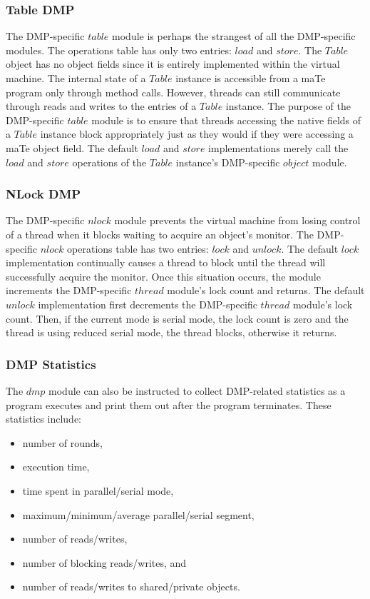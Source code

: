 \subsubsection{Table DMP}

The DMP-specific $table$ module is perhaps the strangest of all the
DMP-specific modules.  The operations table has only two entries:
$load$ and $store$.  The $Table$ object has no object fields since it
is entirely implemented within the virtual machine.  The internal
state of a $Table$ instance is accessible from a maTe program only
through method calls.  However, threads can still communicate through
reads and writes to the entries of a $Table$ instance.  The purpose of
the DMP-specific $table$ module is to ensure that threads accessing
the native fields of a $Table$ instance block appropriately just as
they would if they were accessing a maTe object field.  The default
$load$ and $store$ implementations merely call the $load$ and $store$
operations of the $Table$ instance's DMP-specific $object$ module.

\subsubsection{NLock DMP}

The DMP-specific $nlock$ module prevents the virtual machine from
losing control of a thread when it blocks waiting to acquire an
object's monitor.  The DMP-specific $nlock$ operations table has two
entries: $lock$ and $unlock$.  The default $lock$ implementation
continually causes a thread to block until the thread will
successfully acquire the monitor.  Once this situation occurs, the
module increments the DMP-specific $thread$ module's lock count and
returns.  The default $unlock$ implementation first decrements the
DMP-specific $thread$ module's lock count. Then, if the current mode
is serial mode, the lock count is zero and the thread is using reduced
serial mode, the thread blocks, otherwise it returns.

\subsubsection{DMP Statistics}

The $dmp$ module can also be instructed to collect DMP-related
statistics as a program executes and print them out after the program
terminates.  These statistics include:

\begin{itemize}
\item number of rounds,
\item execution time,
\item time spent in parallel/serial mode,
\item maximum/minimum/average parallel/serial segment,
\item number of reads/writes,
\item number of blocking reads/writes, and
\item number of reads/writes to shared/private objects.
\end{itemize}

